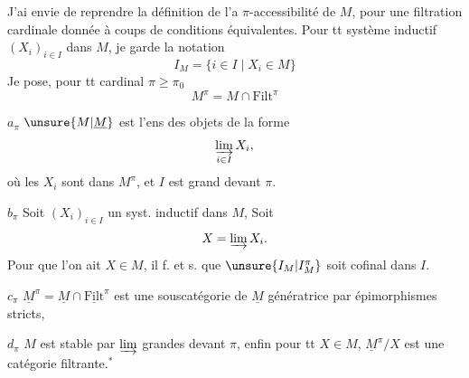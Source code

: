 
J'ai envie de reprendre la définition de l'a $\pi$-accessibilité de $M$, pour une filtration cardinale donnée à coups de conditions équivalentes. Pour tt système inductif  $(X_i)_{i\in I}$ dans $M$, je garde la notation
\[
I_M=\{i\in I\mid X_i\in M\}
\]
Je pose, pour tt cardinal $\pi\geq\pi_0$
\[
M^{\pi}=M\cap\mathrm{Filt}^{\pi}
\]

\textcircled{$a_\pi$} $\unsure{M|\underline M}$ est l'ens des  objets de la forme
\[
\varinjlim_{i\in I}X_i,
\]
où les $X_i$ sont dans $M^{\pi}$, et $I$ est grand devant $\pi$.

\textcircled{\textcircled{$b_\pi$}} Soit $(X_i)_{i\in I}$ un syst. inductif dans $M$,   Soit
\[
X=\varinjlim X_i.
\]
Pour que l'on ait $X\in M$, il f. et s. que $\unsure{I_M|I^{\pi}_M}$ soit cofinal dans $I$.

\textcircled{$c_\pi$} $\underline M^{\pi}=\underline M\cap\underline{\mathrm{Filt}}^{\pi}$ est une souscatégorie de $\underline M$ génératrice par épimorphismes stricts,

\textcircled{$d_\pi$}  $M$ est stable par $\varinjlim$ grandes devant $\pi$, enfin pour tt $X\in M$, $\underline M^{\pi}/X$ est une catégorie filtrante.$^\ast$
